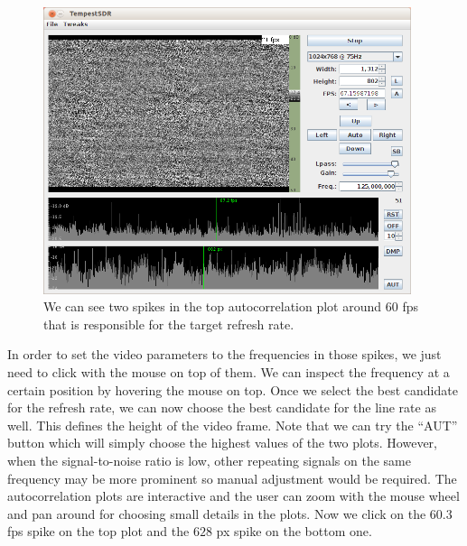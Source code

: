 \documentclass[a4paper,12pt,twoside,openright]{report}
\begin{document}
\begin{figure}[h]
\centering
  \includegraphics[width=0.96\textwidth]{demo_firstdetection}
  \caption{We can see two spikes in the top autocorrelation plot around $60$ fps that is responsible for the target refresh rate.}
  \label{fig:demofirst}
\end{figure}

In order to set the video parameters to the frequencies in those spikes, we just need to click with the mouse on top of them. We can inspect the frequency at a certain position by hovering the mouse on top. Once we select the best candidate for the refresh rate, we can now choose the best candidate for the line rate as well. This defines the height of the video frame. Note that we can try the ``AUT'' button which will simply choose the highest values of the two plots. However, when the signal-to-noise ratio is low, other repeating signals on the same frequency may be more prominent so manual adjustment would be required. The autocorrelation plots are interactive and the user can zoom with the mouse wheel and pan around for choosing small details in the plots. Now we click on the $60.3$ fps spike on the top plot and the $628$ px spike on the bottom one.
\end{document}
